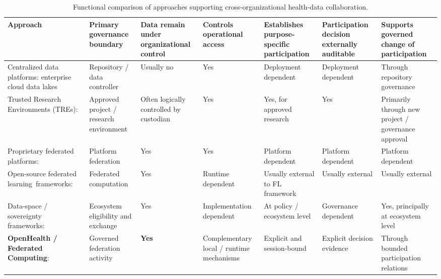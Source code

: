 \documentclass[twoside,11pt]{article}
\begin{document}
\begin{landscape}
\begin{table}[htbp]
\centering
\scriptsize
\caption{Functional comparison of approaches supporting cross-organizational health-data collaboration.}
\label{tab:existing-solutions}

\begin{tabularx}{\linewidth}{
    >{\raggedright\arraybackslash}p{4.0cm}
    >{\raggedright\arraybackslash}p{2.5cm}
    >{\raggedright\arraybackslash}p{2.5cm}
    >{\raggedright\arraybackslash}p{2.0cm}
    >{\raggedright\arraybackslash}p{2.5cm}
    >{\raggedright\arraybackslash}p{2.5cm}
    >{\raggedright\arraybackslash}p{2.5cm}
}
\toprule
\textbf{Approach} &
\textbf{Primary governance boundary} &
\textbf{Data remain under organizational control} &
\textbf{Controls operational access} &
\textbf{Establishes purpose-specific participation} &
\textbf{Participation decision externally auditable} &
\textbf{Supports governed change of participation} \\
\midrule

Centralized data platforms: enterprise cloud data lakes~\cite{Runyon_2022}  
&
Repository / data controller
&
Usually no
&
Yes
&
Deployment dependent
&
Deployment dependent
&
Through repository governance
\\
\addlinespace
Trusted Research Environments (TREs): 
~\cite{OpenSAFELY, Williamson_2020, Kavianpour_2022}  
&
Approved project / research environment
&
Often logically controlled by custodian
&
Yes
&
Yes, for approved research
&
Yes
&
Primarily through new project / governance approval
\\
\addlinespace
Proprietary federated platforms:\cite{RhinoHealth, Syntropy, MayoClinicPlatform}  
&
Platform federation
&
Yes
&
Yes
&
Platform dependent
&
Platform dependent
&
Platform dependent
\\
\addlinespace
Open-source federated learning~frameworks:~\cite{Beutel_2020, NVIDIA_FLARE, Intel_OpenFL, OpenMined_PySyft, Galtier_2019}  
&
Federated computation
&
Yes
&
Runtime dependent
&
Usually external to FL framework
&
Usually external
&
Usually external
\\
\addlinespace
Data-space / sovereignty frameworks:~\cite{GaiaX, TEHDAS, EuropeanCommission_EHDS}  
&
Ecosystem eligibility and exchange
&
Yes
&
Implementation dependent
&
At policy / ecosystem level
&
Governance dependent
&
Yes, principally at ecosystem level
\\
\addlinespace
\textbf{OpenHealth / Federated Computing}:~\cite{Fenoglio_FCaC_2026}
&
{Governed federation activity}
&
\textbf{Yes}
&
Complementary local / runtime mechanisms
&
{Explicit and session-bound}
&
{Explicit decision evidence}
&
{Through bounded participation relations}
\\
\bottomrule
\end{tabularx}
\end{table}
\end{landscape}
\end{document}
